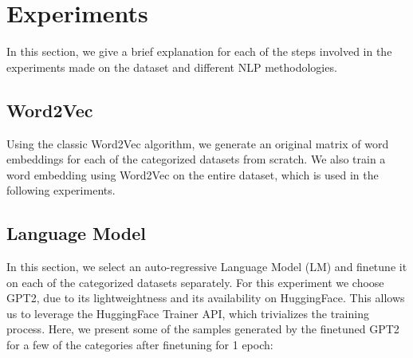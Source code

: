 \documentclass{article}
\begin{document}
\section{Experiments}
In this section, we give a brief explanation for each of the steps involved in the experiments made on the dataset and different NLP methodologies.

\subsection{Word2Vec}
Using the classic Word2Vec algorithm, we generate an original matrix of word embeddings for each of the categorized datasets from scratch.
We also train a word embedding using Word2Vec on the entire dataset, which is used in the following experiments.

\subsection{Language Model}
In this section, we select an auto-regressive Language Model (LM) and finetune it on each of the categorized datasets separately.
For this experiment we choose GPT2, due to its lightweightness and its availability on HuggingFace.
This allows us to leverage the HuggingFace Trainer API, which trivializes the training process.
Here, we present some of the samples generated by the finetuned GPT2 for a few of the categories after finetuning for 1 epoch:
\end{document}
